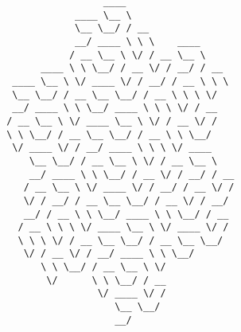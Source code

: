\documentclass{article}
\begin{document}
\vfill
\centering
\fontsize{3pt}{2.75pt}
\begin{BVerbatim}
                  ____                    
             ____ \__ \
             \__ \__/ / __
             __/ ____ \ \ \    ____
            / __ \__ \ \/ / __ \__ \
       ____ \ \ \__/ / __ \/ / __/ / __
  ____ \__ \ \/ ____ \/ / __/ / __ \ \ \
  \__ \__/ / __ \__ \__/ / __ \ \ \ \/
  __/ ____ \ \ \__/ ____ \ \ \ \/ / __
 / __ \__ \ \/ ____ \__ \ \/ / __ \/ /
 \ \ \__/ / __ \__ \__/ / __ \ \ \__/
  \/ ____ \/ / __/ ____ \ \ \ \/ ____
     \__ \__/ / __ \__ \ \/ / __ \__ \
     __/ ____ \ \ \__/ / __ \/ / __/ / __
    / __ \__ \ \/ ____ \/ / __/ / __ \/ /
    \/ / __/ / __ \__ \__/ / __ \/ / __/
    __/ / __ \ \ \__/ ____ \ \ \__/ / __
   / __ \ \ \ \/ ____ \__ \ \/ ____ \/ /
   \ \ \ \/ / __ \__ \__/ / __ \__ \__/
    \/ / __ \/ / __/ ____ \ \ \__/
       \ \ \__/ / __ \__ \ \/
        \/      \ \ \__/ / __
                 \/ ____ \/ /
                    \__ \__/
                    __/
\end{BVerbatim}
\end{document}
